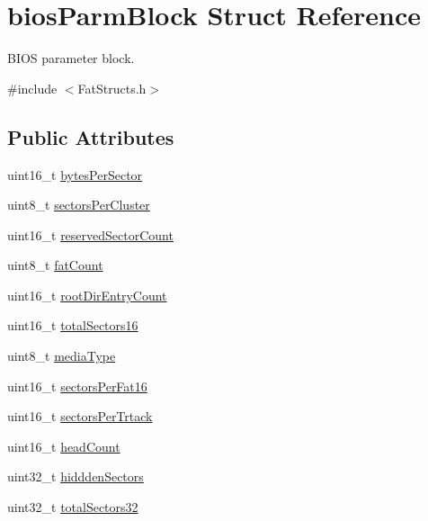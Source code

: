 \hypertarget{structbios_parm_block}{}\section{bios\+Parm\+Block Struct Reference}
\label{structbios_parm_block}


B\+I\+O\+S parameter block.  




{\ttfamily \#include $<$Fat\+Structs.\+h$>$}

\subsection*{Public Attributes}
\begin{DoxyCompactItemize}
\item 
uint16\+\_\+t \hyperlink{structbios_parm_block_aec24d316af486445d55da14cbbfa6bf4}{bytes\+Per\+Sector}
\item 
uint8\+\_\+t \hyperlink{structbios_parm_block_a45d5e2d8c93a028a074e8ce3dc751ab5}{sectors\+Per\+Cluster}
\item 
uint16\+\_\+t \hyperlink{structbios_parm_block_adb4830c345b27293c7d7b97b77f52e01}{reserved\+Sector\+Count}
\item 
uint8\+\_\+t \hyperlink{structbios_parm_block_a7c03f147c3fb18f0df03d346050af13b}{fat\+Count}
\item 
uint16\+\_\+t \hyperlink{structbios_parm_block_a9a1b24bb2dbb3a123c4ffc703954d71d}{root\+Dir\+Entry\+Count}
\item 
uint16\+\_\+t \hyperlink{structbios_parm_block_a686c686fde2fb109bea120f2f434db87}{total\+Sectors16}
\item 
uint8\+\_\+t \hyperlink{structbios_parm_block_a4237e7c3ba247516d546c149954e5042}{media\+Type}
\item 
uint16\+\_\+t \hyperlink{structbios_parm_block_a24d6e5a9069491d5db6dbe747336985b}{sectors\+Per\+Fat16}
\item 
uint16\+\_\+t \hyperlink{structbios_parm_block_a7c27cb7f66c2c9d5266d896e8df227c7}{sectors\+Per\+Trtack}
\item 
uint16\+\_\+t \hyperlink{structbios_parm_block_a2324ca82e2a7da4d91f458fa32a6e239}{head\+Count}
\item 
uint32\+\_\+t \hyperlink{structbios_parm_block_a9413199be8525190d40589f60c22bcab}{hiddden\+Sectors}
\item 
uint32\+\_\+t \hyperlink{structbios_parm_block_abead42e130c40e2aa535202e7cb07578}{total\+Sectors32}
\item 

\end{DoxyCompactItemize}
